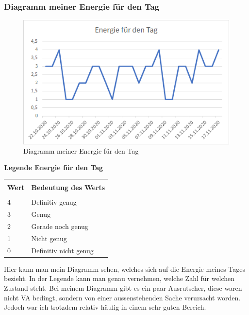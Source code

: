 \subsubsection{Diagramm meiner Energie für den Tag}
\begin{figure}[H]
  \centering
  \includegraphics[width=0.7\linewidth]{./images/bastian_energy.png}
  \caption{Diagramm meiner Energie für den Tag}
\end{figure}
\textbf{Legende Energie für den Tag}
\newline
\begin{table}[htp]
  \begin{tabularx}{\textwidth}{l X}\hline \\
    \textbf{Wert} & \textbf{Bedeutung des Werts}  \\\hline \\
    4 & Definitiv genug \\
    3 & Genug \\
    2 & Gerade noch genug \\
    1 & Nicht genug \\
    0 & Definitiv nicht genug
    \\\hline
  \end{tabularx}
\end{table}
\newline
Hier kann man mein Diagramm sehen, welches sich auf die Energie meines Tages bezieht. In der Legende kann man genau vernehmen, welche Zahl für welchen Zustand steht. Bei meinem Diagramm gibt es ein paar Ausrutscher, diese waren nicht VA bedingt, sondern von einer aussenstehenden Sache verursacht worden. Jedoch war ich trotzdem relativ häufig in einem sehr guten Bereich.
